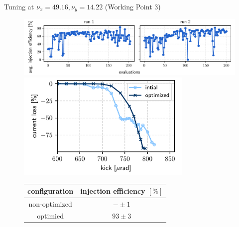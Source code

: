\documentclass[aspectratio=169]{beamer}
\begin{document}
\begin{frame}{Tuning at $\nu_x = 49.16, \nu_y = 14.22$ (Working Point 3)}
    \begin{minipage}{0.55\textwidth}
        \begin{figure}
            \centering
            \includegraphics[width=\textwidth]{wp3_history.pdf}
            \includegraphics[width = 0.75\textwidth]{wp3_kick_resilience.pdf}
            \begin{table}[]
                \scriptsize
                \begin{tabular}{cc}
                \hline
                configuration & injection efficiency $[\%]$  \\ \hline
                non-optimized       & $-\pm1$                   \\
                optimied            & $93\pm3$                    \\ \hline
                \end{tabular}
                \end{table}
        \end{figure}
    \end{minipage}
    \hfill
    \begin{minipage}{0.44\textwidth}
        \begin{figure}
            \centering

\end{figure}
\end{minipage}
\end{frame}
\end{document}

